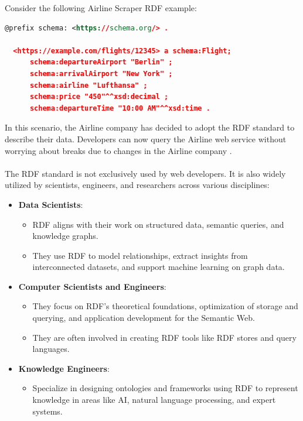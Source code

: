 Consider the following Airline Scraper RDF example:
\begin{lstlisting}[language=XML, caption={RDF representation of the flight data}, label={lst:rdf-example}, frame=single]
  @prefix schema: <https://schema.org/> .
  
  <https://example.com/flights/12345> a schema:Flight;
      schema:departureAirport "Berlin" ;
      schema:arrivalAirport "New York" ;
      schema:airline "Lufthansa" ;
      schema:price "450"^^xsd:decimal ;
      schema:departureTime "10:00 AM"^^xsd:time .
  \end{lstlisting}
  In this scenario, the Airline company has decided to adopt the RDF standard to describe their data.
  Developers can now query the Airline web service without worrying about breaks due to changes in the Airline company \cite{herman2003semanticweb}. 
\\
\\
The RDF standard is not exclusively used by web developers. It is also widely utilized by scientists, engineers, and researchers across various disciplines:
\begin{itemize}
  \item \textbf{Data Scientists}:
  \begin{itemize}
      \item RDF aligns with their work on structured data, semantic queries, and knowledge graphs.
      \item They use RDF to model relationships, extract insights from interconnected datasets, and support machine learning on graph data.
  \end{itemize}
  
  \item \textbf{Computer Scientists and Engineers}:
  \begin{itemize}
      \item They focus on RDF’s theoretical foundations, optimization of storage and querying, and application development for the Semantic Web.
      \item They are often involved in creating RDF tools like RDF stores and query languages.
  \end{itemize}
  
  \item \textbf{Knowledge Engineers}:
  \begin{itemize}
      \item Specialize in designing ontologies and frameworks using RDF to represent knowledge in areas like AI, natural language processing, and expert systems.
  \end{itemize}
\end{itemize}

